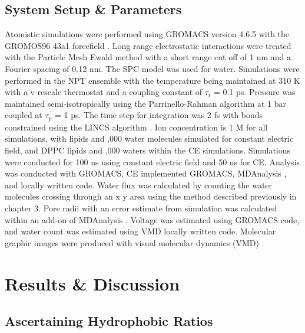 \subsection{System Setup \& Parameters}

Atomistic simulations were performed using GROMACS version 4.6.5 \cite{VanderSpoel2013}
 with the GROMOS96 43a1 forcefield \cite{Scott1999,Schuler2001}. Long range electrostatic interactions were treated with the Particle Mesh Ewald method \cite{Darden1993,Essmann1995} with a short range cut off of 1 nm and a Fourier spacing of 0.12 nm. The SPC model was used for water. Simulations were performed in the NPT ensemble with the temperature being maintained at 310 K with a v-rescale thermostat \cite{Bussi2007d} and a coupling constant of $\tau${$_t$} = 0.1 ps. Pressure was maintained semi-isotropically using the Parrinello-Rahman algorithm \cite{Parrinello1981} at 1 bar coupled at $\tau${$_p$} = 1 ps. The time step for integration was 2 fs with bonds constrained using the LINCS algorithm \cite{Hess1997a}. Ion concentration is 1 M for all simulations, with  lipids and ,000 water molecules simulated for constant electric field, and  DPPC lipids and ,000 waters within the CE simulations. Simulations were conducted for 100 ns using constant electric field and 50 ns for CE. Analysis was conducted with GROMACS, CE implemented GROMACS, MDAnalysis \cite{Michaud-Agrawal2011}, and locally written code. Water flux was calculated by counting the water molecules crossing through an x y area using the method described previously in chapter 3. Pore radii with an error estimate from simulation was calculated within an add-on of MDAnalysis \cite{Stelzl2014}. Voltage was estimated using GROMACS code, and water count was estimated using VMD locally written code.  Molecular graphic images were produced with visual molecular dynamics (VMD) \cite{Humphrey1996}.


\section{Results \& Discussion}

\subsection{Ascertaining Hydrophobic Ratios}

